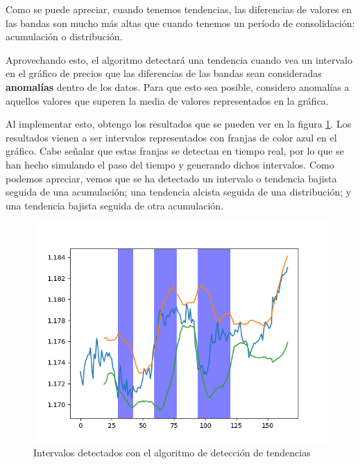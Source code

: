 Como se puede apreciar, cuando tenemos tendencias, las diferencias de valores en las bandas son mucho más altas que cuando tenemos un período de consolidación: acumulación o distribución.\newline

Aprovechando esto, el algoritmo detectará una tendencia cuando vea un intervalo en el gráfico de precios que las diferencias de las bandas sean consideradas \textbf{anomalías} dentro de los datos. Para que esto sea posible, considero anomalías a aquellos valores que superen la media de valores representados en la gráfica.\newline

Al implementar esto, obtengo los resultados que se pueden ver en la figura \ref{intervalos_detectados}. Los resultados vienen a ser intervalos representados con franjas de color azul en el gráfico. Cabe señalar que estas franjas se detectan en tiempo real, por lo que se han hecho simulando el paso del tiempo y generando dichos intervalos. Como podemos apreciar, vemos que se ha detectado un intervalo o tendencia bajista seguida de una acumulación; una tendencia alcista seguida de una distribución; y una tendencia bajista seguida de otra acumulación. \newline

\begin{figure}[h]
	\includegraphics[width=1\textwidth]{imagenes/intervalos_detectados.png}
	\caption{Intervalos detectados con el algoritmo de detección de tendencias} \label{intervalos_detectados}
\end{figure}

